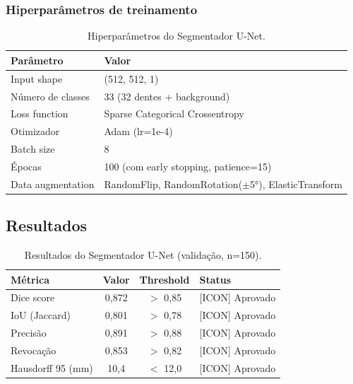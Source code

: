 \subsubsection{Hiperparâmetros de treinamento}

\begin{table}[H]
  \centering
  \caption{Hiperparâmetros do Segmentador U-Net.}
  \label{tab:unet-hyperparams}
  \begin{tabularx}{\textwidth}{lX}
    \toprule
    \textbf{Parâmetro} & \textbf{Valor} \\
    \midrule
    Input shape & (512, 512, 1) \\
    Número de classes & 33 (32 dentes + background) \\
    Loss function & Sparse Categorical Crossentropy \\
    Otimizador & Adam (lr=1e-4) \\
    Batch size & 8 \\
    Épocas & 100 (com early stopping, patience=15) \\
    Data augmentation & RandomFlip, RandomRotation($\pm$5°), ElasticTransform \\
    \bottomrule
  \end{tabularx}
\end{table}

\subsection{Resultados}

\begin{table}[H]
  \centering
  \caption{Resultados do Segmentador U-Net (validação, n=150).}
  \label{tab:unet-results}
  \begin{tabularx}{\textwidth}{lccX}
    \toprule
    \textbf{Métrica} & \textbf{Valor} & \textbf{Threshold} & \textbf{Status} \\
    \midrule
    Dice score & 0,872 & $>$ 0,85 & \textcolor{corTesteSucesso}{[ICON] Aprovado} \\
    IoU (Jaccard) & 0,801 & $>$ 0,78 & \textcolor{corTesteSucesso}{[ICON] Aprovado} \\
    Precisão & 0,891 & $>$ 0,88 & \textcolor{corTesteSucesso}{[ICON] Aprovado} \\
    Revocação & 0,853 & $>$ 0,82 & \textcolor{corTesteSucesso}{[ICON] Aprovado} \\
    Hausdorff 95 (mm) & 10,4 & $<$ 12,0 & \textcolor{corTesteSucesso}{[ICON] Aprovado} \\
    \bottomrule
  \end{tabularx}
\end{table}

